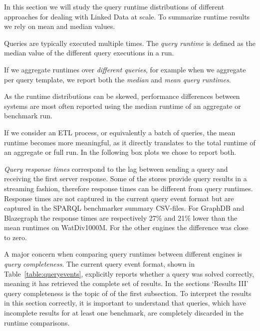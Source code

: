 In this section we will study the query runtime distributions of different approaches for dealing with Linked Data at scale. To summarize runtime results we rely on mean and median values. 

Queries are typically executed multiple times. The \emph{query runtime} is defined as the median value of the different query executions in a run. 

If we aggregate runtimes over \emph{different queries}, for example when we aggregate per query template, we report both the \emph{median} and \emph{mean query runtimes}. 

As the runtime distributions can be skewed, performance differences between systems are most often reported using the median runtime of an aggregate or benchmark run. 

If we consider an ETL process, or equivalently a batch of queries, the mean runtime becomes more meaningful, as it directly translates to the total runtime of an aggregate or full run. In the following box plots we chose to report both.

\emph{Query response times} correspond to the lag between sending a query and receiving the first server response. 
Some of the stores provide query results in a streaming fashion, 
therefore response times can be different from query runtimes.
Response times are not captured in the current query event format but are captured in the SPARQL benchmarker summary CSV-files. For GraphDB and Blazegraph the response times are respectively 27\% and 21\% lower than the mean runtimes on WatDiv1000M. For the other engines the difference was close to zero.

A major concern when comparing query runtimes between different engines is \emph{query completeness}. The current query event format, shown in Table~\ref{table:queryevents}, explicitly reports whether a query was solved correctly, meaning it has retrieved the complete set of results. In the sections `Results III' query completeness is the topic of of the first subsection.
To interpret the results in this section correctly, it is important to understand that queries, which have incomplete results for at least one benchmark, are completely discarded in the runtime comparisons.

